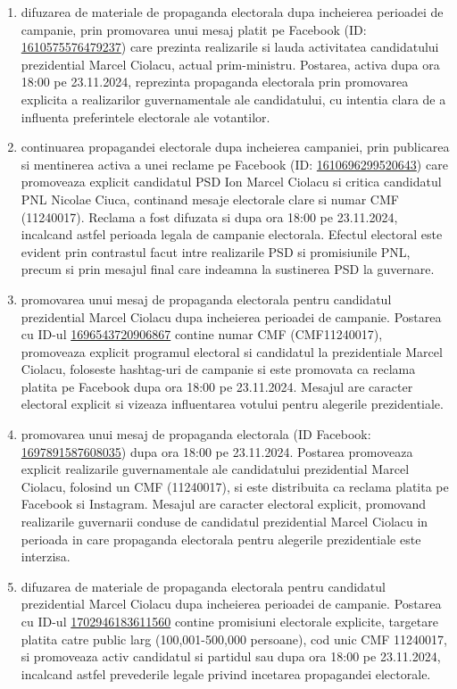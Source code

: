 \documentclass[a4paper,12pt]{article}
\begin{document}
\begin{enumerate}[leftmargin=*, label=\arabic*.)]
    \item difuzarea de materiale de propaganda electorala dupa incheierea perioadei de campanie, prin promovarea unui mesaj platit pe Facebook (ID: \href{https://www.facebook.com/ads/library/?id=1610575576479237}{1610575576479237}) care prezinta realizarile si lauda activitatea candidatului prezidential Marcel Ciolacu, actual prim-ministru. Postarea, activa dupa ora 18:00 pe 23.11.2024, reprezinta propaganda electorala prin promovarea explicita a realizarilor guvernamentale ale candidatului, cu intentia clara de a influenta preferintele electorale ale votantilor.
    \item continuarea propagandei electorale dupa incheierea campaniei, prin publicarea si mentinerea activa a unei reclame pe Facebook (ID: \href{https://www.facebook.com/ads/library/?id=1610696299520643}{1610696299520643}) care promoveaza explicit candidatul PSD Ion Marcel Ciolacu si critica candidatul PNL Nicolae Ciuca, continand mesaje electorale clare si numar CMF (11240017). Reclama a fost difuzata si dupa ora 18:00 pe 23.11.2024, incalcand astfel perioada legala de campanie electorala. Efectul electoral este evident prin contrastul facut intre realizarile PSD si promisiunile PNL, precum si prin mesajul final care indeamna la sustinerea PSD la guvernare.
    \item promovarea unui mesaj de propaganda electorala pentru candidatul prezidential Marcel Ciolacu dupa incheierea perioadei de campanie. Postarea cu ID-ul \href{https://www.facebook.com/ads/library/?id=1696543720906867}{1696543720906867} contine numar CMF (CMF11240017), promoveaza explicit programul electoral si candidatul la prezidentiale Marcel Ciolacu, foloseste hashtag-uri de campanie si este promovata ca reclama platita pe Facebook dupa ora 18:00 pe 23.11.2024. Mesajul are caracter electoral explicit si vizeaza influentarea votului pentru alegerile prezidentiale.
    \item promovarea unui mesaj de propaganda electorala (ID Facebook: \href{https://www.facebook.com/ads/library/?id=1697891587608035}{1697891587608035}) dupa ora 18:00 pe 23.11.2024. Postarea promoveaza explicit realizarile guvernamentale ale candidatului prezidential Marcel Ciolacu, folosind un CMF (11240017), si este distribuita ca reclama platita pe Facebook si Instagram. Mesajul are caracter electoral explicit, promovand realizarile guvernarii conduse de candidatul prezidential Marcel Ciolacu in perioada in care propaganda electorala pentru alegerile prezidentiale este interzisa.
    \item difuzarea de materiale de propaganda electorala pentru candidatul prezidential Marcel Ciolacu dupa incheierea perioadei de campanie. Postarea cu ID-ul \href{https://www.facebook.com/ads/library/?id=1702946183611560}{1702946183611560} contine promisiuni electorale explicite, targetare platita catre public larg (100,001-500,000 persoane), cod unic CMF 11240017, si promoveaza activ candidatul si partidul sau dupa ora 18:00 pe 23.11.2024, incalcand astfel prevederile legale privind incetarea propagandei electorale.

\end{enumerate}
\end{document}
